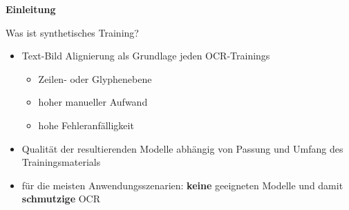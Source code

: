 \documentclass{bbawslides}
\begin{document}
\begin{bbawpart}{\Large\bf Einleitung}
\end{bbawpart}

\begin{bbawslide}{Was ist synthetisches Training?}
  \vspace*{7mm}%
  \centerslidestrue%
  \begin{itemize}
    \item Text-Bild Alignierung als Grundlage jeden OCR-Trainings
    \begin{itemize}
      \item Zeilen- oder Glyphenebene
      \item hoher manueller Aufwand
      \item hohe Fehleranfälligkeit
    \end{itemize}
  \end{itemize}
  \begin{center}
  \end{center}
  \begin{itemize}
    \item Qualität der resultierenden Modelle abhängig von Passung und Umfang des Trainingsmaterials
    \item für die meisten Anwendungsszenarien: \textbf{keine} geeigneten Modelle und damit \textbf{schmutzige} OCR
  \end{itemize}
\end{bbawslide}
\end{document}
